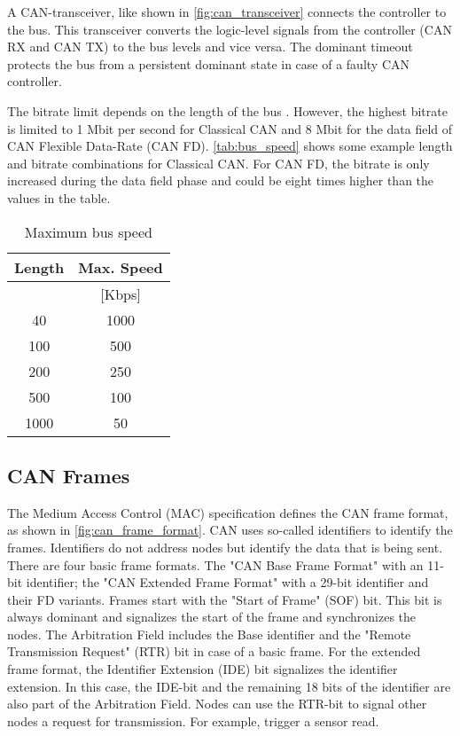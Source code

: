A CAN-transceiver, like shown in \autoref{fig:can_transceiver} connects the controller to the bus.
This transceiver converts the logic-level signals from the controller (CAN RX and CAN TX) to the bus levels and vice versa.
The dominant timeout protects the bus from a persistent dominant state in case of a faulty CAN controller.



The bitrate limit depends on the length of the bus \cite{TiCANPhy}.
However, the highest bitrate is limited to 1 Mbit per second for Classical CAN \cite{BoschCAN} and 8 Mbit for the data field of CAN Flexible Data-Rate (CAN FD)\cite{BoschCANFD}.
\autoref{tab:bus_speed} shows some example length and bitrate combinations for Classical CAN.
For CAN FD, the bitrate is only increased during the data field phase and could be eight times higher than the values in the table.

\begin{table}[ht]
	\centering
	\caption{Maximum bus speed}
	\begin{tabular}{|c|c|} 
		\hline
		Length & Max. Speed \\ \hline
		[m]    & [Kbps]     \\
		\hline
		\hline
		40     & 1000       \\ \hline
		100    & 500        \\ \hline
		200    & 250        \\ \hline
		500    & 100        \\ \hline
		1000   & 50         \\ \hline
	\end{tabular}
	\label{tab:bus_speed}
\end{table}

\FloatBarrier

\subsection{CAN Frames}
\label{sec:can_frames}



The Medium Access Control (MAC) specification defines the CAN frame format, as shown in \autoref{fig:can_frame_format}.
CAN uses so-called identifiers to identify the frames. Identifiers do not address nodes but identify the data that is being sent.
There are four basic frame formats. The "CAN Base Frame Format" with an 11-bit identifier; the "CAN Extended Frame Format" with a 29-bit identifier and their FD variants.
Frames start with the "Start of Frame" (SOF) bit. This bit is always dominant and signalizes the start of the frame and synchronizes the nodes.
The Arbitration Field includes the Base identifier and the "Remote Transmission Request" (RTR) bit in case of a basic frame.
For the extended frame format, the Identifier Extension (IDE) bit signalizes the identifier extension.
In this case, the IDE-bit and the remaining 18 bits of the identifier are also part of the Arbitration Field.
Nodes can use the RTR-bit to signal other nodes a request for transmission. For example, trigger a sensor read.

